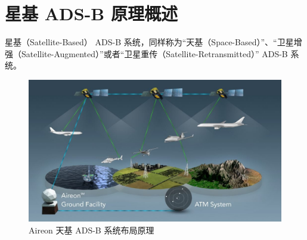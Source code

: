 
\chapter{星基 ADS-B 原理概述}

星基（Satellite-Based） ADS-B 系统，同样称为“天基（Space-Based）”、“卫星增强（Satellite-Augmented）”或者“卫星重传（Satellite-Retransmitted）” ADS-B 系统。

\begin{figure}[htbp]
\centering
\includegraphics[width=15cm]{pic/Aireon_GlobalSpaceBasedADSB_Coverage_Diagram-1024x576.jpg}
\caption{Aireon 天基 ADS-B 系统布局原理}
\label{fig:Aireon_GlobalSpaceBasedADSB_Coverage_Diagram}
\end{figure}
